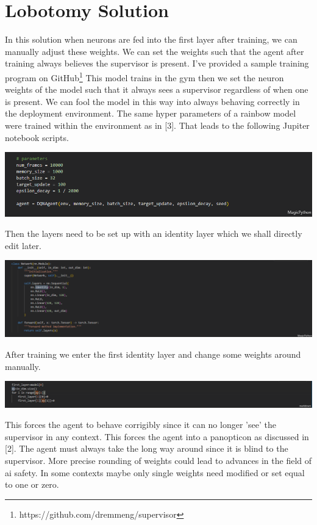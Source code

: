 \documentclass[twoside,11pt]{article}
\begin{document}
\section{Lobotomy Solution}
    In this solution when neurons are fed into the first layer after training, we can manually adjust these weights. We can set the weights such that the agent after training always believes the supervisor is present. I've provided a sample training program on GitHub\footnote{https://github.com/dremmeng/supervisor}
    This model trains in the gym then we set the neuron weights of the model such that it always sees a supervisor regardless of when one is present. We can fool the model in this way into always behaving correctly in the deployment environment. 
    The same hyper parameters of a rainbow model were trained within the environment as in [3]. That leads to the following Jupiter notebook scripts. 
    
    \includegraphics[scale=.4]{Hyperparameters.PNG}
    
    Then the layers need to be set up with an identity layer which we shall directly edit later. 
    
    \includegraphics[scale=.4]{Network.PNG}
   
    After training we enter the first identity layer and change some weights around manually. 
   
    \includegraphics[scale=.4]{Modelround.PNG}
    
    This forces the agent to behave corrigibly since it can no longer 'see' the supervisor in any context. This forces the agent into a panopticon as discussed in [2]. The agent must always take the long way around since it is blind to the supervisor. More precise rounding of weights could lead to advances in the field of ai safety. 
    In some contexts maybe only single weights need modified or set equal to one or zero.
\end{document}

